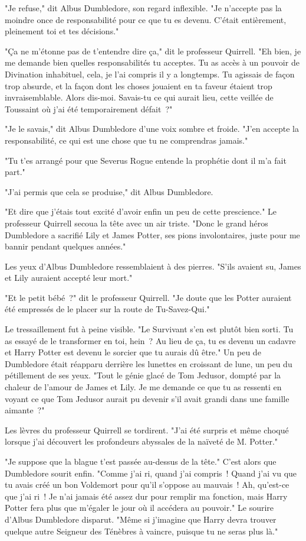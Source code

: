"Je refuse," dit Albus Dumbledore, son regard inflexible. "Je n'accepte pas la moindre once de responsabilité pour ce que tu es devenu. C'était entièrement, pleinement toi et tes décisions."

"Ça ne m'étonne pas de t'entendre dire ça," dit le professeur Quirrell. "Eh bien, je me demande bien quelles responsabilités tu acceptes. Tu as accès à un pouvoir de Divination inhabituel, cela, je l'ai compris il y a longtemps. Tu agissais de façon trop absurde, et la façon dont les choses jouaient en ta faveur étaient trop invraisemblable. Alors dis-moi. Savais-tu ce qui aurait lieu, cette veillée de Toussaint où j'ai été temporairement défait~?"

"Je le savais," dit Albus Dumbledore d'une voix sombre et froide. "J'en accepte la responsabilité, ce qui est une chose que tu ne comprendras jamais."

"Tu t'es arrangé pour que Severus Rogue entende la prophétie dont il m'a fait part."

"J'ai permis que cela se produise," dit Albus Dumbledore.

"Et dire que j'étais tout excité d'avoir enfin un peu de cette prescience." Le professeur Quirrell secoua la tête avec un air triste. "Donc le grand héros Dumbledore a sacrifié Lily et James Potter, ses pions involontaires, juste pour me bannir pendant quelques années."

Les yeux d'Albus Dumbledore ressemblaient à des pierres. "S'ils avaient su, James et Lily auraient accepté leur mort."

"Et le petit bébé~?" dit le professeur Quirrell. "Je doute que les Potter auraient été empressés de le placer sur la route de Tu-Savez-Qui."

Le tressaillement fut à peine visible. "Le Survivant s'en est plutôt bien sorti. Tu as essayé de le transformer en toi, hein~? Au lieu de ça, tu es devenu un cadavre et Harry Potter est devenu le sorcier que tu aurais dû être." Un peu de Dumbledore était réapparu derrière les lunettes en croissant de lune, un peu du pétillement de ses yeux. "Tout le génie glacé de Tom Jedusor, dompté par la chaleur de l'amour de James et Lily. Je me demande ce que tu as ressenti en voyant ce que Tom Jedusor aurait pu devenir s'il avait grandi dans une famille aimante~?"

Les lèvres du professeur Quirrell se tordirent. "J'ai été surpris et même choqué lorsque j'ai découvert les profondeurs abyssales de la naïveté de M. Potter."

"Je suppose que la blague t'est passée au-dessus de la tête." C'est alors que Dumbledore sourit enfin. "Comme j'ai ri, quand j'ai compris~! Quand j'ai vu que tu avais créé un bon Voldemort pour qu'il s'oppose au mauvais~! Ah, qu'est-ce que j'ai ri~! Je n'ai jamais été assez dur pour remplir ma fonction, mais Harry Potter fera plus que m'égaler le jour où il accédera au pouvoir." Le sourire d'Albus Dumbledore disparut. "Même si j'imagine que Harry devra trouver quelque autre Seigneur des Ténèbres à vaincre, puisque tu ne seras plus là."

